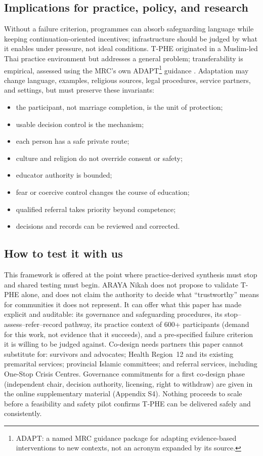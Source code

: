 \documentclass[11pt]{article}
\newcommand{\tphe}{T\mbox{-}PHE}
\begin{document}
\subsection{Implications for practice, policy, and research}
Without a failure criterion, programmes can absorb safeguarding language while keeping continuation-oriented incentives; infrastructure should be judged by what it enables under pressure, not ideal conditions. \tphe{} originated in a Muslim-led Thai practice environment but addresses a general problem; transferability is empirical, assessed using the MRC's own ADAPT\footnote{ADAPT: a named MRC guidance package for adapting evidence-based interventions to new contexts, not an acronym expanded by its source.} guidance \cite{ref53}. Adaptation may change language, examples, religious sources, legal procedures, service partners, and settings, but must preserve these invariants:
\begin{itemize}
\item the participant, not marriage completion, is the unit of protection;
\item usable decision control is the mechanism;
\item each person has a safe private route;
\item culture and religion do not override consent or safety;
\item educator authority is bounded;
\item fear or coercive control changes the course of education;
\item qualified referral takes priority beyond competence;
\item decisions and records can be reviewed and corrected.
\end{itemize}

\subsection{How to test it with us}
This framework is offered at the point where practice-derived synthesis must stop and shared testing must begin. ARAYA Nikah does not propose to validate \tphe{} alone, and does not claim the authority to decide what ``trustworthy'' means for communities it does not represent. It can offer what this paper has made explicit and auditable: its governance and safeguarding procedures, its stop--assess--refer--record pathway, its practice context of 600+ participants (demand for this work, not evidence that it succeeds), and a pre-specified failure criterion it is willing to be judged against. Co-design needs partners this paper cannot substitute for: survivors and advocates; Health Region~12 and its existing premarital services; provincial Islamic committees; and referral services, including One-Stop Crisis Centres. Governance commitments for a first co-design phase (independent chair, decision authority, licensing, right to withdraw) are given in the online supplementary material (Appendix S4). Nothing proceeds to scale before a feasibility and safety pilot confirms \tphe{} can be delivered safely and consistently.
\end{document}
